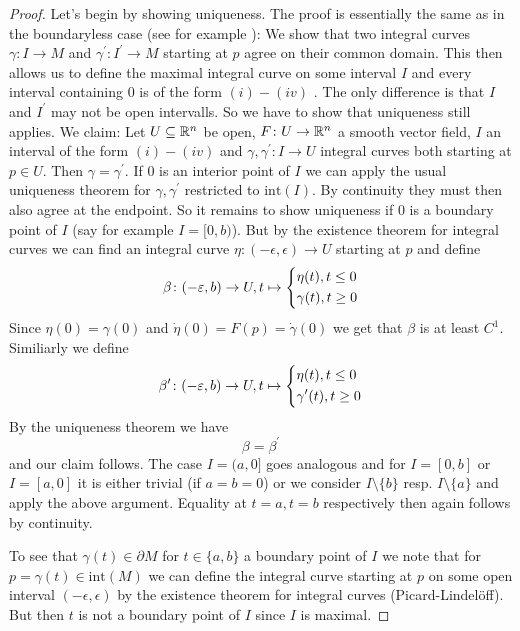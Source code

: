 \begin{proof}Let's begin by showing uniqueness. The proof is essentially the same as in the boundaryless case (see for example \cite{lee2011smooth}): We show that two integral curves $\gamma \colon I \to M$ and $\gamma^\prime \colon I^\prime \to M$ starting at $p$ agree on their common domain. This then allows us to define the maximal integral curve on some interval $I$ and every interval containing $0$ is of the form $(i) - (iv)$ \footnotemark. The only difference is that $I$ and $I^\prime$ may not be open intervalls. So we have to show that uniqueness still applies. We claim: Let $U \subseteq \mathbb{R}^n$ be open, $F \colon U \to \mathbb{R}^n$ a smooth vector field, $I$ an interval of the form $(i) - (iv)$ and $\gamma,\gamma^\prime \colon I \to U$ integral curves both starting at $p \in U$. Then $\gamma = \gamma^\prime$. If $0$ is an interior point of $I$ we can apply the usual uniqueness theorem for $\gamma,\gamma^\prime$ restricted to $\mathrm{int}(I)$. By continuity they must then also agree at the endpoint. So it remains to show uniqueness if $0$ is a boundary point of $I$ (say for example $I = [0,b)$). But by the existence theorem for integral curves we can find an integral curve $\eta \colon (-\epsilon,\epsilon) \to U$ starting at $p$ and define
\[
\beta \colon (-\epsilon,b) \to U, t \mapsto \begin{dcases*}
    \eta(t), t \leq 0 \\
    \gamma(t), t \geq 0
\end{dcases*}
\]
Since $\eta(0) = \gamma(0)$ and $\dot{\eta}(0) = F(p) = \dot{\gamma}(0)$ we get that $\beta$ is at least $C^1$. Similiarly we define
\[
\beta^\prime \colon (-\epsilon,b) \to U, t \mapsto \begin{dcases*}
    \eta(t), t \leq 0 \\
    \gamma^\prime(t), t \geq 0
\end{dcases*}
\]
By the uniqueness theorem we have
\[
\beta = \beta^\prime
\]
and our claim follows. The case $I = (a,0]$ goes analogous and for $I = [0,b]$ or $I = [a,0]$ it is either trivial (if $a = b = 0$) or we consider $I\setminus \{b\}$ resp. $I\setminus \{a\}$ and apply the above argument. Equality at $t = a, t = b$ respectively then again follows by continuity.

To see that $\gamma(t) \in \partial M$ for $t \in \{a,b\}$ a boundary point of $I$ we note that for $ p = \gamma(t) \in \mathrm{int}(M)$ we can define the integral curve starting at $p$ on some open interval $(-\epsilon,\epsilon)$ by the existence theorem for integral curves (Picard-Lindelöff). But then $t$ is not a boundary point of $I$ since $I$ is maximal.


\end{proof}
